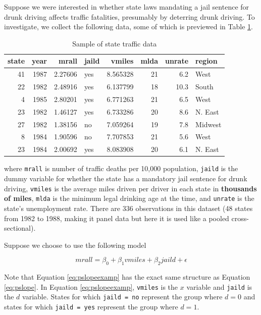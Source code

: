 \documentclass[
]{book}
\begin{document}
Suppose we were interested in whether state laws mandating a jail sentence for drunk driving affects traffic fatalities, presumably by deterring drunk driving. To investigate, we collect the following data, some of which is previewed in Table \ref{tab:trdeath}.

\begin{table}

\caption{\label{tab:trdeath}Sample of state traffic data}
\centering
\begin{tabular}[t]{r|r|r|l|r|r|r|l}
\hline
state & year & mrall & jaild & vmiles & mlda & unrate & region\\
\hline
41 & 1987 & 2.27606 & yes & 8.565328 & 21 & 6.2 & West\\
\hline
22 & 1982 & 2.48916 & yes & 6.137799 & 18 & 10.3 & South\\
\hline
4 & 1985 & 2.80201 & yes & 6.771263 & 21 & 6.5 & West\\
\hline
23 & 1982 & 1.46127 & yes & 6.733286 & 20 & 8.6 & N. East\\
\hline
27 & 1982 & 1.38156 & no & 7.059264 & 19 & 7.8 & Midwest\\
\hline
8 & 1984 & 1.90596 & no & 7.707853 & 21 & 5.6 & West\\
\hline
23 & 1984 & 2.00692 & yes & 8.083908 & 20 & 6.1 & N. East\\
\hline
\end{tabular}
\end{table}

where \texttt{mrall} is number of traffic deaths per 10,000 population, \texttt{jaild} is the dummy variable for whether the state has a mandatory jail sentence for drunk driving, \texttt{vmiles} is the average miles driven per driver in each state in \textbf{thousands of miles}, \texttt{mlda} is the minimum legal drinking age at the time, and \texttt{unrate} is the state's unemployment rate. There are 336 observations in this dataset (48 states from 1982 to 1988, making it panel data but here it is used like a pooled cross-sectional).

Suppose we choose to use the following model

\begin{equation}
mrall = \beta_0 + \beta_1vmiles + \beta_2jaild + \epsilon
\label{eq:pslopeexamp}
\end{equation}

Note that Equation \eqref{eq:pslopeexamp} has the exact same structure as Equation \eqref{eq:pslope}. In Equation \eqref{eq:pslopeexamp}, \texttt{vmiles} is the \(x\) variable and \texttt{jaild} is the \(d\) variable. States for which \texttt{jaild\ =\ no} represent the group where \(d=0\) and states for which \texttt{jaild\ =\ yes} represent the group where \(d=1\).
\end{document}
